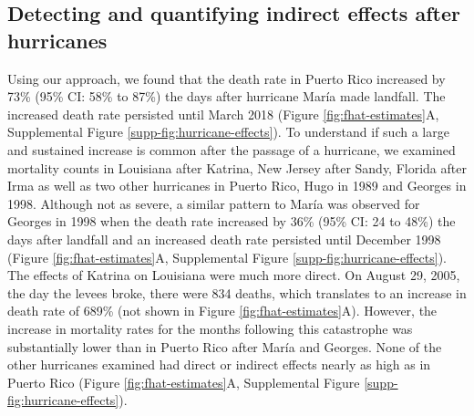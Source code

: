 \documentclass[11pt]{article}
\begin{document}
\subsection{Detecting and quantifying indirect effects after hurricanes}
\label{subsec:effects}
Using our approach, we found that the death rate in Puerto Rico increased by 73\% (95\% CI: 58\% to 87\%) the days after hurricane Mar\'ia made landfall. The increased death rate persisted until March 2018 (Figure \ref{fig:fhat-estimates}A, Supplemental Figure \ref{supp-fig:hurricane-effects}). To understand if such a large and sustained increase is common after the passage of a hurricane, we examined mortality counts in Louisiana after Katrina, New Jersey after Sandy, Florida after Irma as well as two other hurricanes in Puerto Rico, Hugo in 1989 and Georges in 1998.  Although not as severe, a similar pattern to Mar\'ia was observed for Georges in 1998 when the death rate increased by 36\% (95\% CI: 24 to 48\%) the days after landfall and an increased death rate persisted until December 1998 (Figure \ref{fig:fhat-estimates}A, Supplemental Figure \ref{supp-fig:hurricane-effects}). The effects of Katrina on Louisiana were much more direct. On August 29, 2005, the day the levees broke, there were 834 deaths, which translates to an increase in death rate of 689\% (not shown in Figure \ref{fig:fhat-estimates}A). However, the increase in mortality rates for the months following this catastrophe was substantially lower than in Puerto Rico after Mar\'ia and Georges. None of the other hurricanes examined had direct or indirect effects nearly as high as in Puerto Rico (Figure \ref{fig:fhat-estimates}A, Supplemental Figure \ref{supp-fig:hurricane-effects}).
\end{document}
